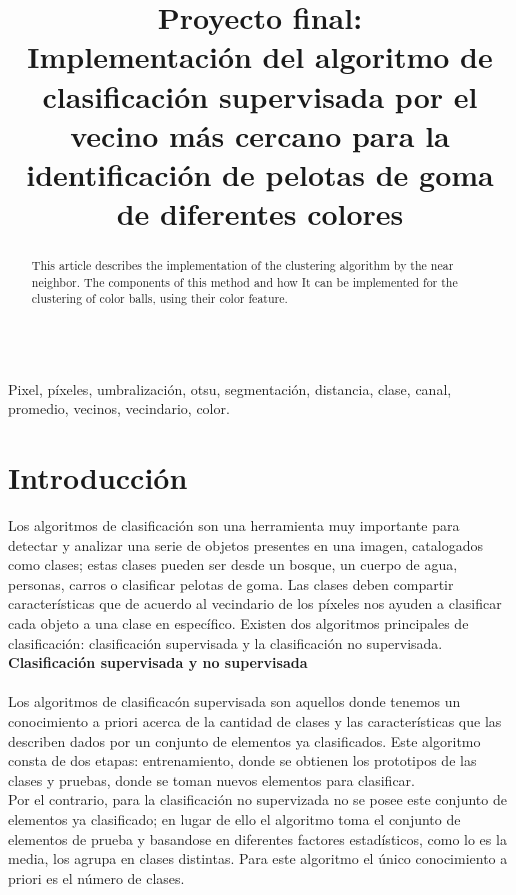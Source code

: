 \documentclass[conference]{IEEEtran}
\begin{document}
\title{ Proyecto final:\\ Implementaci\'on del algoritmo de clasificaci\'on supervisada por el vecino m\'as cercano para la identificaci\'on de pelotas de goma de diferentes colores }
\author{
}

\maketitle
\renewcommand\abstractname{Abstract}
\begin{abstract}
This article describes the implementation of the clustering algorithm by the near neighbor. The components of this method and how It can be implemented for the clustering of color balls, using their color feature.\\\\
\end{abstract}

\begin{IEEEkeywords}
Pixel, p\'ixeles, umbralizaci\'on, otsu, segmentaci\'on, distancia, clase, canal, promedio, vecinos, vecindario, color.
\end{IEEEkeywords}

\IEEEpeerreviewmaketitle
\section{Introducci\'on}
Los algoritmos de clasificaci\'on son una herramienta muy importante para detectar y analizar una serie de objetos presentes en una imagen, catalogados como clases; estas clases pueden ser desde un bosque, un cuerpo de agua, personas, carros o clasificar pelotas de goma. Las clases deben compartir caracter\'isticas que de acuerdo al vecindario de los p\'ixeles nos ayuden a clasificar cada objeto a una clase en espec\'ifico. Existen dos algoritmos principales de clasificaci\'on: clasificaci\'on supervisada y la clasificaci\'on no supervisada.\\

\textbf{Clasificaci\'on supervisada y no supervisada \\\\}
Los algoritmos de clasificac\'on supervisada son aquellos donde tenemos un conocimiento a priori acerca de la cantidad de clases y las caracter\'isticas que las describen dados por un conjunto de elementos ya clasificados. Este algoritmo consta de dos etapas: entrenamiento, donde se obtienen los prototipos de las clases y pruebas, donde se toman nuevos elementos para clasificar.\\
Por el contrario, para la clasificaci\'on no supervizada no se posee este conjunto de elementos ya clasificado; en lugar de ello el algoritmo toma el conjunto de elementos de prueba y basandose en diferentes factores estad\'isticos, como lo es la media, los agrupa en clases distintas. Para este algoritmo el \'unico conocimiento a priori es el n\'umero de clases. \\
\end{document}
